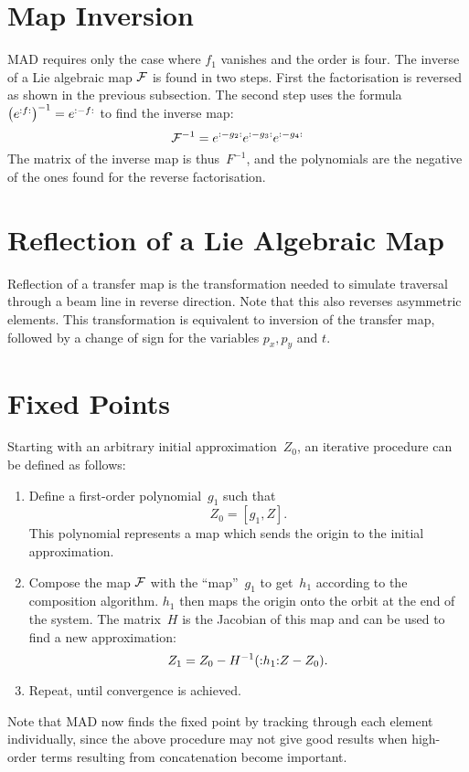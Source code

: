  
\section{Map Inversion}
MAD requires only the case where $f_1$ vanishes and the order is four.
The inverse of a Lie algebraic map ${\cal F}$ is found in two steps.
First the factorisation is reversed as shown in the previous subsection.
The second step uses the formula 
$\left(e^{{:}{f}{:}}\right)^{-1} = e^{{:}{-f}{:}}$
to find the inverse map:
\begin{equation}
{\cal F}^{-1}=e^{{:}{-g_2}{:}}e^{{:}{-g_3}{:}}e^{{:}{-g_4}{:}}
\end{equation}
The matrix of the inverse map is thus~$F^{-1}$,
and the polynomials are the negative of the ones found for the reverse
factorisation.
 
 
\section{Reflection of a Lie Algebraic Map}
Reflection of a transfer map is the transformation needed to simulate
traversal through a beam line in reverse direction.
Note that this also reverses asymmetric elements.
This transformation is equivalent to inversion of the transfer map,
followed by a change of sign for the variables $p_x, p_y$ and $t$.
 
 
\section{Fixed Points}
Starting with an arbitrary initial approximation~$Z_0$,
an iterative procedure can be defined as follows:
\begin{enumerate}
\item
Define a first-order polynomial~$g_1$ such that
\begin{equation}
Z_0 = [g_1, Z].
\end{equation}
This polynomial represents a map which sends  the origin to the
initial approximation.
\item
Compose the map $\cal F$ with the ``map''~$g_1$ to get~$h_1$
according to the composition algorithm.
$h_1$ then maps the origin onto the orbit at the end of the system.
The matrix~$H$ is the Jacobian of this map and can be used to find
a new approximation:
\begin{equation}
Z_1 = Z_0 - H^{-1} ({:}{h_1}{:} Z - Z_0).
\end{equation}
\item
Repeat, until convergence is achieved.
\end{enumerate}
Note that MAD now finds the fixed point by tracking through each
element individually, since the above procedure may not give good
results when high-order terms resulting from concatenation become
important.
 
